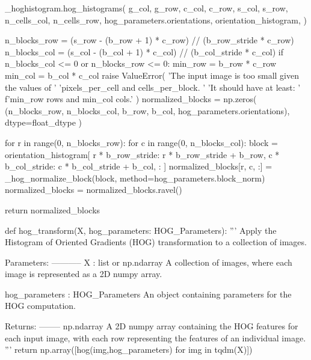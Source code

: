 \begin{pythoncode}
    _hoghistogram.hog_histograms(
        g_col,
        g_row,
        c_col,
        c_row,
        s_col,
        s_row,
        n_cells_col,
        n_cells_row,
        hog_parameters.orientations,
        orientation_histogram,
    )

    n_blocks_row = (s_row - (b_row + 1) * c_row) // (b_row_stride * c_row)
    n_blocks_col = (s_col - (b_col + 1) * c_col) // (b_col_stride * c_col)
    if n_blocks_col <= 0 or n_blocks_row <= 0:
        min_row = b_row * c_row
        min_col = b_col * c_col
        raise ValueError(
            'The input image is too small given the values of '
            'pixels_per_cell and cells_per_block. '
            'It should have at least: '
            f'{min_row} rows and {min_col} cols.'
        )
    normalized_blocks = np.zeros(
        (n_blocks_row, n_blocks_col, b_row, b_col, hog_parameters.orientations), dtype=float_dtype
    )

    for r in range(0, n_blocks_row):
        for c in range(0, n_blocks_col):
            block = orientation_histogram[
                    r * b_row_stride: r * b_row_stride + b_row,  
                    c * b_col_stride: c * b_col_stride + b_col,  
                    :
                    ]
            normalized_blocks[r, c, :] = _hog_normalize_block(block, method=hog_parameters.block_norm)
    normalized_blocks = normalized_blocks.ravel()

    return normalized_blocks
    
def hog_transform(X, hog_parameters: HOG_Parameters):
    '''
    Apply the Histogram of Oriented Gradients (HOG) transformation to a collection of images.

    Parameters:
    -----------
    X : list or np.ndarray
        A collection of images, where each image is represented as a 2D numpy array.
    
    hog_parameters : HOG_Parameters
        An object containing parameters for the HOG computation.
    
    Returns:
    --------
    np.ndarray
        A 2D numpy array containing the HOG features for each input image, 
        with each row representing the features of an individual image.
    '''
    return np.array([hog(img,hog_parameters) for img in tqdm(X)])
    
\end{pythoncode}
